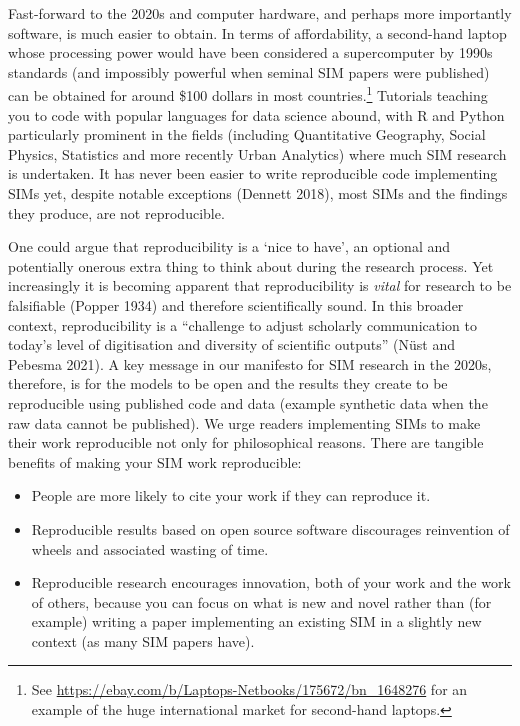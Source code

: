 \documentclass[11pt,letterpaper]{article}
\begin{document}
Fast-forward to the 2020s and computer hardware, and perhaps more importantly software, is much easier to obtain.
In terms of affordability, a second-hand laptop whose processing power would have been considered a supercomputer by 1990s standards (and impossibly powerful when seminal SIM papers were published) can be obtained for around \$100 dollars in most countries.\footnote{See \url{https://ebay.com/b/Laptops-Netbooks/175672/bn_1648276} for an example of the huge international market for second-hand laptops.}
Tutorials teaching you to code with popular languages for data science abound, with R and Python particularly prominent in the fields (including Quantitative Geography, Social Physics, Statistics and more recently Urban Analytics) where much SIM research is undertaken.
It has never been easier to write reproducible code implementing SIMs yet, despite notable exceptions (Dennett 2018), most SIMs and the findings they produce, are not reproducible.

One could argue that reproducibility is a `nice to have', an optional and potentially onerous extra thing to think about during the research process.
Yet increasingly it is becoming apparent that reproducibility is \emph{vital} for research to be falsifiable (Popper 1934) and therefore scientifically sound.
In this broader context, reproducibility is a ``challenge to adjust scholarly communication to today's level of digitisation and diversity of scientific outputs'' (Nüst and Pebesma 2021).
A key message in our manifesto for SIM research in the 2020s, therefore, is for the models to be open and the results they create to be reproducible using published code and data (example synthetic data when the raw data cannot be published).
We urge readers implementing SIMs to make their work reproducible not only for philosophical reasons.
There are tangible benefits of making your SIM work reproducible:

\begin{itemize}
\item
  People are more likely to cite your work if they can reproduce it.
\item
  Reproducible results based on open source software discourages reinvention of wheels and associated wasting of time.
\item
  Reproducible research encourages innovation, both of your work and the work of others, because you can focus on what is new and novel rather than (for example) writing a paper implementing an existing SIM in a slightly new context (as many SIM papers have).
\end{itemize}
\end{document}
